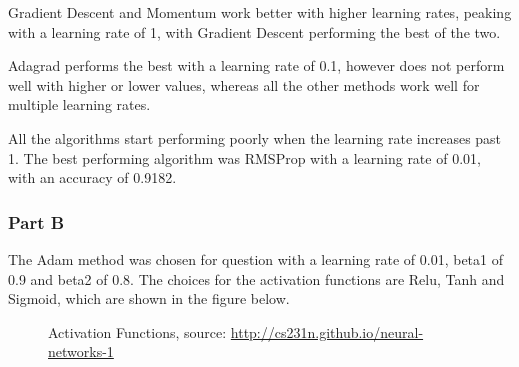 Gradient Descent and Momentum work better with higher learning rates, peaking with a learning rate of 1, with Gradient Descent performing the best of the two.

Adagrad performs the best with a learning rate of 0.1, however does not perform well with higher or lower values, whereas all the other methods work well for multiple learning rates.

All the algorithms start performing poorly when the learning rate increases past 1. The best performing algorithm was RMSProp with a learning rate of 0.01, with an accuracy of 0.9182.

\subsubsection*{Part B}

The Adam method was chosen for question with a learning rate of 0.01, beta1 of 0.9 and beta2 of 0.8.
The choices for the activation functions are Relu, Tanh and Sigmoid, which are shown in the figure below.

\begin{figure}[H]%
    \centering
    \qquad
    \qquad
    \caption{Activation Functions, source: \protect\url{http://cs231n.github.io/neural-networks-1}}%
\end{figure}

